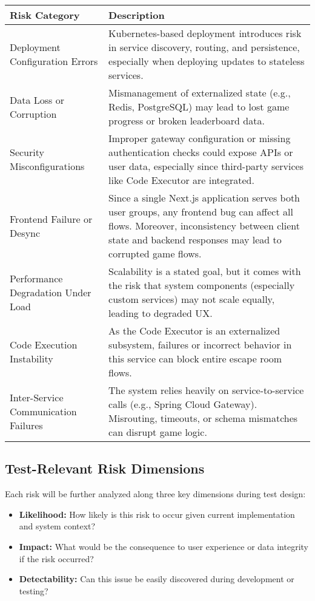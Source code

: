 \begin{tabularx}{\textwidth}{|p{5cm}|X|}
    \hline
    \textbf{Risk Category} & \textbf{Description} \\
    \hline
    Deployment Configuration Errors &
    Kubernetes-based deployment introduces risk in service discovery, routing, and persistence, especially when deploying updates to stateless services. \\
    \hline
    Data Loss or Corruption &
    Mismanagement of externalized state (e.g., Redis, PostgreSQL) may lead to lost game progress or broken leaderboard data. \\
    \hline
    Security Misconfigurations &
    Improper gateway configuration or missing authentication checks could expose APIs or user data, especially since third-party services like Code Executor are integrated. \\
    \hline
    Frontend Failure or Desync &
    Since a single Next.js application serves both user groups, any frontend bug can affect all flows. Moreover, inconsistency between client state and backend responses may lead to corrupted game flows. \\
    \hline
    Performance Degradation Under Load &
    Scalability is a stated goal, but it comes with the risk that system components (especially custom services) may not scale equally, leading to degraded UX. \\
    \hline
    Code Execution Instability &
    As the Code Executor is an externalized subsystem, failures or incorrect behavior in this service can block entire escape room flows. \\
    \hline
    Inter-Service Communication Failures &
    The system relies heavily on service-to-service calls (e.g., Spring Cloud Gateway). Misrouting, timeouts, or schema mismatches can disrupt game logic. \\
    \hline
\end{tabularx}

\subsection*{Test-Relevant Risk Dimensions}

Each risk will be further analyzed along three key dimensions during test design:

\begin{itemize}
    \item \textbf{Likelihood:} How likely is this risk to occur given current implementation and system context?
    \item \textbf{Impact:} What would be the consequence to user experience or data integrity if the risk occurred?
    \item \textbf{Detectability:} Can this issue be easily discovered during development or testing?
\end{itemize}

